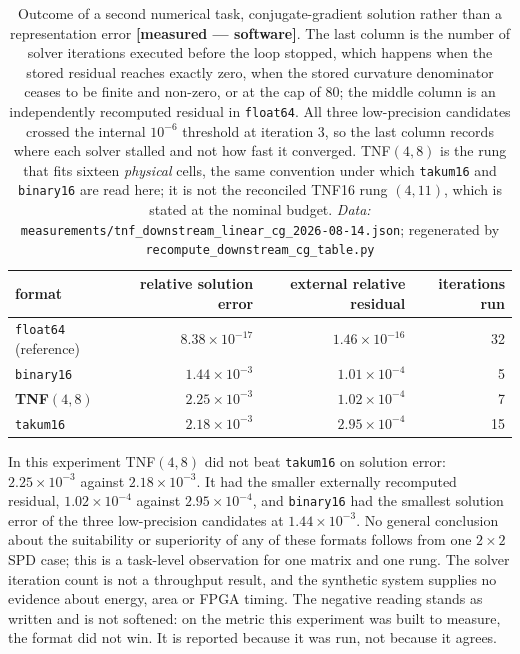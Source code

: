 \documentclass[11pt]{article}
\theoremstyle{definition}
\begin{document}
\begin{table}[t]\centering\small
\caption{Outcome of a second numerical task, conjugate-gradient solution rather
than a representation error \textbf{[measured --- software]}. The last column is
the number of solver iterations executed before the loop stopped, which happens when
the stored residual reaches exactly zero, when the stored curvature denominator
ceases to be finite and non-zero, or at the cap of $80$; the middle column is an
independently recomputed residual in \texttt{float64}. All three low-precision
candidates crossed the internal $10^{-6}$ threshold at iteration 3, so the last
column records where each solver stalled and not how fast it converged.
TNF$(4,8)$ is the rung that fits sixteen \emph{physical} cells, the same
convention under which \texttt{takum16} and \texttt{binary16} are read here; it
is not the reconciled TNF16 rung $(4,11)$, which is stated at the nominal
budget. \emph{Data:} \texttt{measurements/tnf\_downstream\_linear\_cg\_2026-08-14.json}; regenerated by \texttt{recompute\_downstream\_cg\_table.py}}
\label{tab:downstream-cg}
\begin{tabular}{lrrr}
\toprule
format & relative solution error & external relative residual & iterations run \\
\midrule
\texttt{float64} (reference) & $8.38\times10^{-17}$ & $1.46\times10^{-16}$ & 32 \\
\texttt{binary16}            & $1.44\times10^{-3}$  & $1.01\times10^{-4}$  & 5  \\
\textbf{TNF$(4,8)$}          & $2.25\times10^{-3}$  & $1.02\times10^{-4}$  & 7  \\
\texttt{takum16}             & $2.18\times10^{-3}$  & $2.95\times10^{-4}$  & 15 \\
\bottomrule
\end{tabular}
\end{table}

In this experiment TNF$(4,8)$ did not beat \texttt{takum16} on solution error:
$2.25\times10^{-3}$ against $2.18\times10^{-3}$. It had the smaller externally
recomputed residual, $1.02\times10^{-4}$ against $2.95\times10^{-4}$, and
\texttt{binary16} had the smallest solution error of the three low-precision
candidates at $1.44\times10^{-3}$. No general conclusion about the suitability or
superiority of any of these formats follows from one $2\times2$ SPD case; this is a
task-level observation for one matrix and one rung. The solver iteration count is
not a throughput result, and the synthetic system supplies no evidence about
energy, area or FPGA timing. The negative reading stands as written and is not
softened: on the metric this experiment was built to measure, the format did not
win. It is reported because it was run, not because it agrees.
\end{document}

